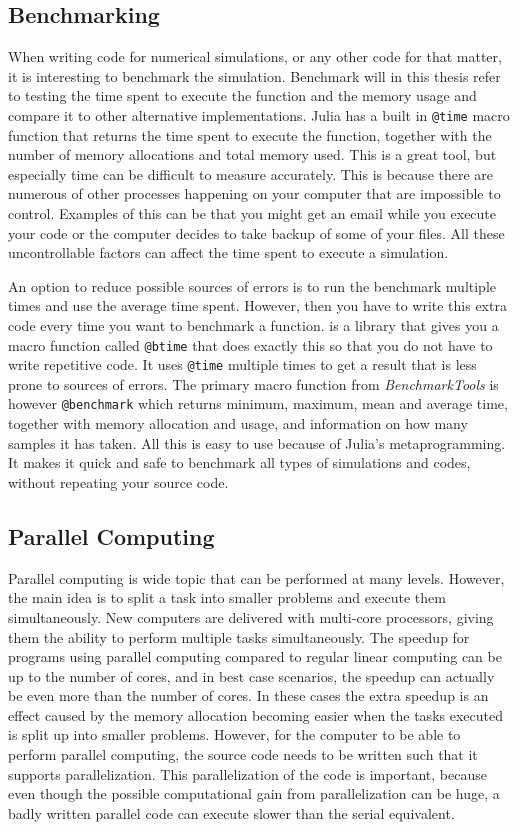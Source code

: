 \subsection{Benchmarking}
\label{sec:benchmarking}
When writing code for numerical simulations, or any other code for that matter, it is interesting to benchmark the simulation. Benchmark will in this thesis refer to testing the time spent to execute the function and the memory usage and compare it to other alternative implementations. Julia has a built in \texttt{@time} macro function \emph{\citep{@time}} that returns the time spent to execute the function, together with the number of memory allocations and total memory used. This is a great tool, but especially time can be difficult to measure accurately. This is because there are numerous of other processes happening on your computer that are impossible to control. Examples of this can be that you might get an email while you execute your code or the computer decides to take backup of some of your files. All these uncontrollable factors can affect the time spent to execute a simulation. 

An option to reduce possible sources of errors is to run the benchmark multiple times and use the average time spent. However, then you have to write this extra code every time you want to benchmark a function. \emph{\cite{BenchmarkTools}} is a library that gives you a macro function called \texttt{@btime} that does exactly this so that you do not have to write repetitive code. It uses \texttt{@time} multiple times to get a result that is less prone to sources of errors. The primary macro function from \textit{BenchmarkTools} is however \texttt{@benchmark} which returns minimum, maximum, mean and average time, together with memory allocation and usage, and information on how many samples it has taken. All this is easy to use because of Julia's metaprogramming. It makes it quick and safe to benchmark all types of simulations and codes, without repeating your source code.

\subsection{Parallel Computing}
\label{sec:parallelComputing}
Parallel computing is wide topic that can be performed at many levels. However, the main idea is to split a task into smaller problems and execute them simultaneously. New computers are delivered with multi-core processors, giving them the ability to perform multiple tasks simultaneously. The speedup for programs using parallel computing compared to regular linear computing can be up to the number of cores, and in best case scenarios, the speedup can actually be even more than the number of cores. In these cases the extra speedup is an effect caused by the memory allocation becoming easier when the tasks executed is split up into smaller problems. However, for the computer to be able to perform parallel computing, the source code needs to be written such that it supports parallelization. This parallelization of the code is important, because even though the possible computational gain from parallelization can be huge, a badly written parallel code can execute slower than the serial equivalent. 


